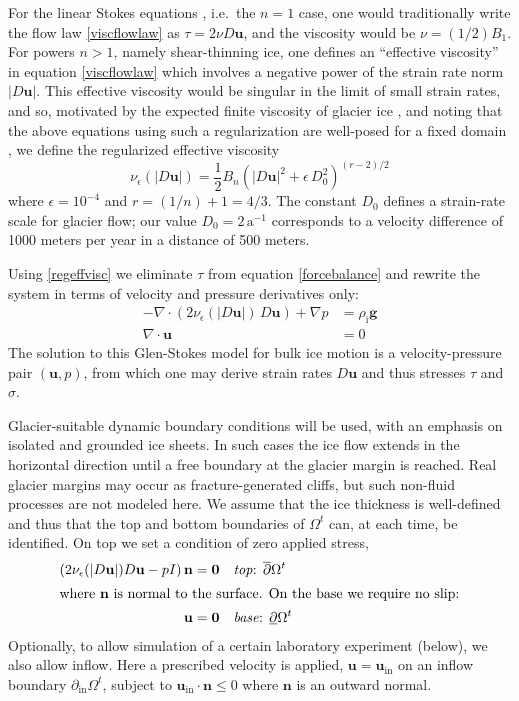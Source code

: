 \documentclass[letterpaper,final,12pt,reqno]{amsart}
\newcommand{\eps}{\epsilon}
\newcommand{\Div}{\nabla\cdot}
\newcommand{\bn}{\mathbf{n}}
\newcommand{\bu}{\mathbf{u}}
\newcommand{\bzero}{\bm{0}}
\newcommand{\rhoi}{\rho_{\text{i}}}
\begin{document}
For the linear Stokes equations \cite{Elmanetal2014}, i.e.~the $n=1$ case, one would traditionally write the flow law \eqref{viscflowlaw} as $\tau = 2\nu D\bu$, and the viscosity would be $\nu = (1/2) B_1$.  For powers $n>1$, namely shear-thinning ice, one defines an ``effective viscosity'' in equation \eqref{viscflowlaw} which involves a negative power of the strain rate norm $|D\bu|$.  This effective viscosity would be singular in the limit of small strain rates, and so, motivated by the expected finite viscosity of glacier ice \cite{GreveBlatter2009}, and noting that the above equations using such a regularization are well-posed for a fixed domain \cite{JouvetRappaz2011}, we define the regularized effective viscosity
\begin{equation}
\nu_\eps(|D\bu|) = \frac{1}{2} B_n \left(|D\bu|^2 + \eps\, D_0^2\right)^{(r-2)/2} \label{regeffvisc}
\end{equation}
where $\eps = 10^{-4}$ and $r=(1/n)+1=4/3$.  The constant $D_0$ defines a strain-rate scale for glacier flow; our value $D_0 = 2 \,\text{a}^{-1}$ corresponds to a velocity difference of 1000 meters per year in a distance of 500 meters.

Using \eqref{regeffvisc} we eliminate $\tau$ from equation \eqref{forcebalance} and rewrite the system in terms of velocity and pressure derivatives only:
\begin{align}
- \nabla \cdot \left(2 \nu_\eps(|D\bu|)\, D\bu\right) + \nabla p &= \rhoi \mathbf{g} \label{stokes} \\
\Div \bu &= 0 \label{incompagain}
\end{align}
The solution to this Glen-Stokes model for bulk ice motion is a velocity-pressure pair $(\bu,p)$, from which one may derive strain rates $D\bu$ and thus stresses $\tau$ and $\sigma$.

Glacier-suitable dynamic boundary conditions will be used, with an emphasis on isolated and grounded ice sheets.  In such cases the ice flow extends in the horizontal direction until a free boundary at the glacier margin is reached.  Real glacier margins may occur as fracture-generated cliffs, but such non-fluid processes are not modeled here.  We assume that the ice thickness is well-defined and thus that the top and bottom boundaries of $\Omega^t$ can, at each time, be identified.  On top we set a condition of zero applied stress,
\begin{align}
\left(2 \nu_\eps(|D\bu|) D\bu - pI\right) \bn &= \bzero  &&\text{\emph{top}: } \overline{\partial} \Omega^t \label{topbc} \\
\intertext{where $\bn$ is normal to the surface.  On the base we require no slip:}
\bu &= \bzero  &&\text{\emph{base}: } \underline{\partial} \Omega^t \label{basebc}
\end{align}
Optionally, to allow simulation of a certain laboratory experiment \cite{SayagWorster2013} (below), we also allow inflow.  Here a prescribed velocity is applied, $\bu = \bu_{\text{in}}$ on an inflow boundary $\partial_{\text{in}} \Omega^t$, subject to $\bu_{\text{in}}\cdot \bn \le 0$ where $\bn$ is an outward normal.
\end{document}
